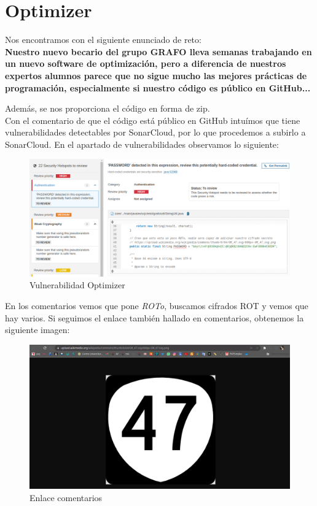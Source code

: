 \documentclass[12pt, a4paper,twoside,titlepage]{article}
\begin{document}
\newpage

\section{Optimizer}

Nos encontramos con el siguiente enunciado de reto:\\

\textbf{Nuestro nuevo becario del grupo GRAFO lleva semanas trabajando en un nuevo software de optimización, pero a diferencia de nuestros expertos alumnos parece que no sigue mucho las mejores prácticas de programación, especialmente si nuestro código es público en GitHub...}

Además, se nos proporciona el código en forma de zip.\\

Con el comentario de que el código está público en GitHub intuímos que tiene vulnerabilidades detectables por SonarCloud, por lo que procedemos a subirlo a SonarCloud. En el apartado de vulnerabilidades observamos lo siguiente:\\

\begin{figure}[H]
    \centering
    \includegraphics[width=1\linewidth]{Figuras/Optimizer/1.png}
    \caption{Vulnerabilidad Optimizer}
    \label{fig:Optimizer}
\end{figure}

En los comentarios vemos que pone \emph{ROTo}, buscamos cifrados ROT y vemos que hay varios. Si seguimos el enlace también hallado en comentarios, obtenemos la siguiente imagen:

\begin{figure}[H]
    \centering
    \includegraphics[width=1\linewidth]{Figuras/Optimizer/2.png}
    \caption{Enlace comentarios}
    \label{fig:Optimizer}
\end{figure}
\end{document}
